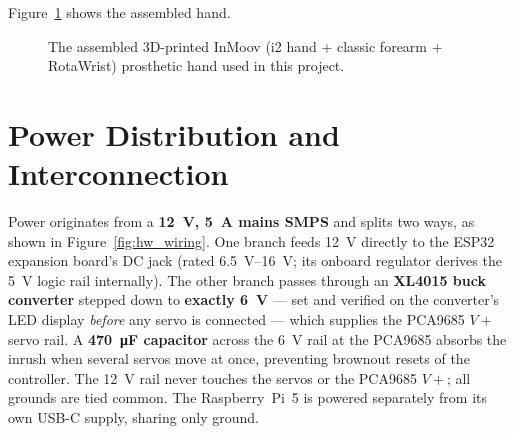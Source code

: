 Figure~\ref{fig:hw_hand_photo} shows the assembled hand.

\begin{figure}[htbp]
\centering
\caption{The assembled 3D-printed InMoov (i2 hand + classic forearm +
RotaWrist) prosthetic hand used in this project.}
\label{fig:hw_hand_photo}
\end{figure}

\section{Power Distribution and Interconnection}
\label{sec:hw_wiring}

Power originates from a \textbf{\SI{12}{\volt}, \SI{5}{\ampere}
mains SMPS} and splits two ways, as shown in
Figure~\ref{fig:hw_wiring}. One branch feeds \SI{12}{\volt} directly
to the ESP32 expansion board's DC jack (rated
\SIrange{6.5}{16}{\volt}; its onboard regulator derives the
\SI{5}{\volt} logic rail internally). The other branch passes through
an \textbf{XL4015 buck converter} stepped down to \textbf{exactly
\SI{6}{\volt}} --- set and verified on the converter's LED display
\emph{before} any servo is connected --- which supplies the PCA9685
\(V\!+\) servo rail. A \textbf{\SI{470}{\micro\farad} capacitor}
across the \SI{6}{\volt} rail at the PCA9685 absorbs the inrush when
several servos move at once, preventing brownout resets of the
controller. The \SI{12}{\volt} rail never touches the servos or the
PCA9685 \(V\!+\); all grounds are tied common. The Raspberry~Pi~5 is
powered separately from its own USB-C supply, sharing only ground.

